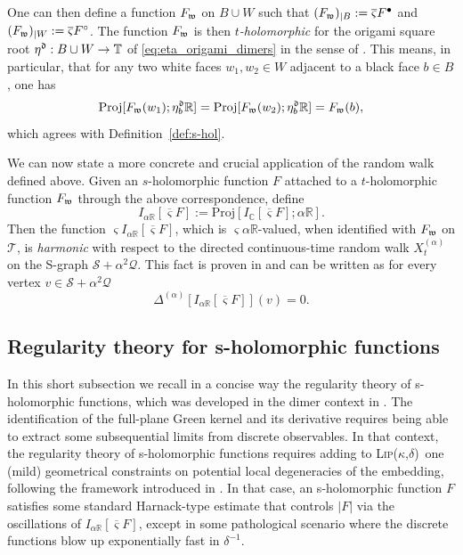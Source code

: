 \documentclass[reqno]{amsart}
\numberwithin{equation}{section}
\theoremstyle{definition}
\theoremstyle{remark}
\newcommand\R{\mathbb{R}}
\newcommand\cQ{\mathcal{Q}}
\newcommand\cS{\mathcal{S}}
\newcommand\cT{\mathcal{T}}
\def\LipKd{{\mbox{\textsc{Lip(}$\kappa$\textsc{,}$\delta$\textsc{)}}}}
\begin{document}
One can then define a function $F_\frak{w}$ on $B \cup W$ such that $(F_\frak{w})_{|B} := \overline{\varsigma} F^{\bullet}$ and $(F_\frak{w})_{|W} := \overline{\varsigma} F^{\circ}$. The function $F_\frak{w}$ is then \emph{$t$-holomorphic} for the origami square root $\eta^\frak{d} : B \cup W \to \mathbb{T}$ of \eqref{eq:eta_origami_dimers} in the sense of \cite[Definition~3.2]{CLR1}. This means, in particular, that for any two white faces $w_1, w_2 \in W$ adjacent to a black face $b \in B$, one has
\[
    \mathrm{Proj}[F_\frak{w}(w_1); \eta^\frak{d}_b \mathbb{R}]
    = \mathrm{Proj}[F_\frak{w}(w_2); \eta^\frak{d}_b \mathbb{R}]
    = F_\frak{w}(b),
\]
which agrees with Definition~\ref{def:s-hol}.

We can now state a more concrete and crucial application of the random walk defined above. Given an $s$-holomorphic function $F$ attached to a $t$-holomorphic function $F_\frak{w}$ through the above correspondence, define
\[
    I_{\alpha \mathbb{R}}[\overline{\varsigma} F]
    := \mathrm{Proj}[I_{\mathbb{C}}[\overline{\varsigma} F]; \alpha \mathbb{R}].
\]
Then the function $\varsigma I_{\alpha \mathbb{R}}[\overline{\varsigma} F]$, which is $\varsigma \alpha \mathbb{R}$-valued, when identified with $F_\frak{w}$ on $\cT$, is \emph{harmonic} with respect to the directed continuous-time random walk $X^{(\alpha)}_t$ on the S-graph $\cS + \alpha^2 \cQ$. This fact is proven in \cite[Proposition~4.15]{CLR1} and can be written as for every vertex $v \in \cS + \alpha^2 \cQ$
\[
    \Delta^{(\alpha)}[I_{\alpha \mathbb{R}}[\overline{\varsigma} F]](v) = 0.
\]

\subsection{Regularity theory for s-holomorphic functions}\label{sub:regularity}
In this short subsection we recall in a concise way the regularity theory of s-holomorphic functions, which was developed in the dimer context in \cite[Section 6.5]{CLR1}. The identification of the full-plane Green kernel and its derivative requires being able to extract some subsequential limits from discrete observables. In that context, the regularity theory of s-holomorphic functions requires adding to \LipKd\, one (mild) geometrical constraints on potential local degeneracies of the embedding, following the framework introduced in \cite[Assumption 1.2]{CLR1}. In that case, an s-holomorphic function $F$ satisfies some standard Harnack-type estimate that controls $|F| $ via the oscillations of $I_{\alpha\R}[\overline{\varsigma}F]$, except in some pathological scenario where the discrete functions blow up exponentially fast in $\delta^{-1} $. 
\end{document}
